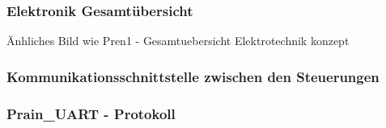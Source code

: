 \documentclass[main.tex]{subfiles} %
\begin{document}

\subsubsection{Elektronik Gesamtübersicht}

Änhliches Bild wie Pren1 - Gesamtuebersicht Elektrotechnik konzept

\subsubsection{Kommunikationsschnittstelle zwischen den Steuerungen}

\subsubsection*{Prain\_UART - Protokoll}
\end{document}
